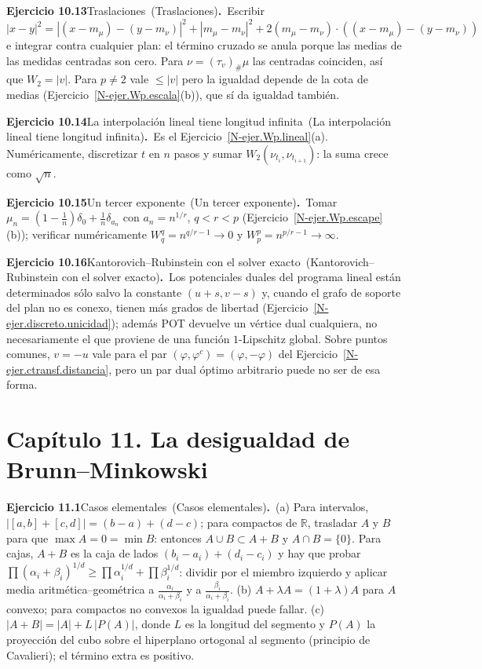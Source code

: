 \documentclass[11pt,a4paper]{amsart}
\newcommand{\R}{{\mathbb R}}
\theoremstyle{remark}
\theoremstyle{definition}
\numberwithin{subsection}{section}
\numberwithin{equation}{section}
\newcommand{\ejlabel}[2]{\par\medskip\noindent\textbf{Ejercicio #1}\ifx\relax#2\relax\else\ (#2)\fi\textbf{.}\ }
\begin{document}
\ejlabel{10.13}{Traslaciones}Escribir $|x-y|^2=|(x-m_\mu)-(y-m_\nu)|^2+|m_\mu-m_\nu|^2+2(m_\mu-m_\nu)\cdot((x-m_\mu)-(y-m_\nu))$ e integrar contra cualquier plan: el término cruzado se anula porque las medias de las medidas centradas son cero. Para $\nu=(\tau_v)_\#\mu$ las centradas coinciden, así que $W_2=|v|$. Para $p\ne2$ vale $\le|v|$ pero la igualdad depende de la cota de medias (Ejercicio~\ref{N-ejer.Wp.escala}(b)), que sí da igualdad también.

\ejlabel{10.14}{La interpolación lineal tiene longitud infinita}Es el Ejercicio~\ref{N-ejer.Wp.lineal}(a). Numéricamente, discretizar $t$ en $n$ pasos y sumar $W_2(\nu_{t_i},\nu_{t_{i+1}})$: la suma crece como $\sqrt n$.

\ejlabel{10.15}{Un tercer exponente}Tomar $\mu_n=(1-\frac1n)\delta_0+\frac1n\delta_{a_n}$ con $a_n=n^{1/r}$, $q<r<p$ (Ejercicio~\ref{N-ejer.Wp.escape}(b)); verificar numéricamente $W_q^q=n^{q/r-1}\to0$ y $W_p^p=n^{p/r-1}\to\infty$.

\ejlabel{10.16}{Kantorovich--Rubinstein con el solver exacto}Los potenciales duales del programa lineal están determinados sólo salvo la constante $(u+s,v-s)$ y, cuando el grafo de soporte del plan no es conexo, tienen más grados de libertad (Ejercicio~\ref{N-ejer.discreto.unicidad}); además POT devuelve un vértice dual cualquiera, no necesariamente el que proviene de una función $1$-Lipschitz global. Sobre puntos comunes, $v=-u$ vale para el par $(\varphi,\varphi^c)=(\varphi,-\varphi)$ del Ejercicio~\ref{N-ejer.ctransf.distancia}, pero un par dual óptimo arbitrario puede no ser de esa forma.

\section*{Capítulo 11. La desigualdad de Brunn--Minkowski}
\ejlabel{11.1}{Casos elementales}(a) Para intervalos, $|[a,b]+[c,d]|=(b-a)+(d-c)$; para compactos de $\R$, trasladar $A$ y $B$ para que $\max A=0=\min B$: entonces $A\cup B\subset A+B$ y $A\cap B=\{0\}$. Para cajas, $A+B$ es la caja de lados $(b_i-a_i)+(d_i-c_i)$ y hay que probar $\prod(\alpha_i+\beta_i)^{1/d}\ge\prod\alpha_i^{1/d}+\prod\beta_i^{1/d}$: dividir por el miembro izquierdo y aplicar media aritmética--geométrica a $\frac{\alpha_i}{\alpha_i+\beta_i}$ y a $\frac{\beta_i}{\alpha_i+\beta_i}$. (b) $A+\lambda A=(1+\lambda)A$ para $A$ convexo; para compactos no convexos la igualdad puede fallar. (c) $|A+B|=|A|+L\,|P(A)|$, donde $L$ es la longitud del segmento y $P(A)$ la proyección del cubo sobre el hiperplano ortogonal al segmento (principio de Cavalieri); el término extra es positivo.
\end{document}
